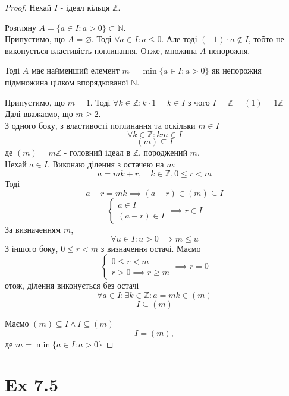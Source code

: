 \documentclass[11pt, a4paper]{article} %
\newcommand{\N}{\mathbb{N}}
\newcommand{\Z}{\mathbb{Z}}
\begin{document}
\begin{proof}
    Нехай $I$ - ідеал кільця $\Z$.

    Розгляну $A = \{a \in I : a > 0\} \subset \N$.\\

    Припустимо, що $A = \varnothing$. Тоді $\forall a \in I: a \le 0$. 
    Але тоді $(-1) \cdot a \notin I$, тобто не виконується властивість поглинання. 
    Отже, множина $A$ непорожня.

    Тоді $A$ має найменший елемент $m = \min \{a \in I: a>0\}$ як непорожня підмножина цілком впорядкованої $\N$.


    Припустимо, що $m=1$. Тоді $\forall k \in \Z: k\cdot 1 = k \in I$ з чого $I = \Z = (1) = 1\Z$\\
    Далі вважаємо, що $m\ge 2$.\\

    З одного боку, з властивості поглинання та оскільки $m \in I$ 
    \[\forall k \in \Z: km \in I\]
    \[(m) \subseteq I\]
    де $(m)=m\Z$ - головний ідеал в $\Z$, породжений $m$.\\

    Нехай $a \in I$. Виконаю ділення з остачею на $m$:
    \[a = mk + r, \quad k\in\Z, 0\le r < m\]
    Тоді
    \[a-r = mk \implies (a-r) \in (m) \subseteq I\]
    \[\begin{cases}
        a \in I\\
        (a-r) \in I
    \end{cases} \implies r \in I\]
    За визначенням $m$,
    \[\forall u \in I: u>0 \implies m \le u\]
    З іншого боку, $0 \le r < m$ з визначення остачі.
    Маємо
    \[\begin{cases}
        0 \le r < m\\
        r>0 \implies r \ge m
    \end{cases} \implies r=0\]
    отож, ділення виконується без остачі
    \[\forall a\in I: \exists k\in\Z: a = mk \in (m)\]
    \[I \subseteq (m)\]

    Маємо $(m) \subseteq I \land I \subseteq (m)$
    \[I = (m),\]
    де $m = \min \{a \in I: a>0\}$
\end{proof}

\section*{Ex 7.5}
\begin{mdframed}
    
\end{mdframed}
\end{document}
